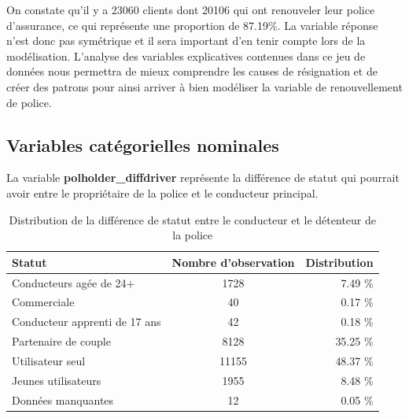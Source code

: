 \documentclass[
]{article}
\begin{document}
On constate qu'il y a 23060 clients dont 20106 qui ont renouveler leur
police d'assurance, ce qui représente une proportion de 87.19\%. La
variable réponse n'est donc pas symétrique et il sera important d'en
tenir compte lors de la modélisation. L'analyse des variables
explicatives contenues dans ce jeu de données nous permettra de mieux
comprendre les causes de résignation et de créer des patrons pour ainsi
arriver à bien modéliser la variable de renouvellement de police.

\hypertarget{variables-catuxe9gorielles-nominales}{%
\subsection{Variables catégorielles
nominales}\label{variables-catuxe9gorielles-nominales}}

La variable \textbf{polholder\_diffdriver} représente la différence de
statut qui pourrait avoir entre le propriétaire de la police et le
conducteur principal.

\begin{table}[ht]
\centering
\caption{Distribution de la différence de statut entre le conducteur et le détenteur de la police} 
\label{tbl:statutdiff}
\begin{tabular}{lcr}
  \hline
Statut & Nombre d'observation & Distribution \\ 
  \hline
Conducteurs agée de 24+ & 1728 & 7.49 \% \\ 
  Commerciale & 40 & 0.17 \% \\ 
  Conducteur apprenti de 17 ans & 42 & 0.18 \% \\ 
  Partenaire de couple & 8128 & 35.25 \% \\ 
  Utilisateur seul & 11155 & 48.37 \% \\ 
  Jeunes utilisateurs & 1955 & 8.48 \% \\ 
  Données manquantes & 12 & 0.05 \% \\ 
   \hline
\end{tabular}
\end{table}
\end{document}
